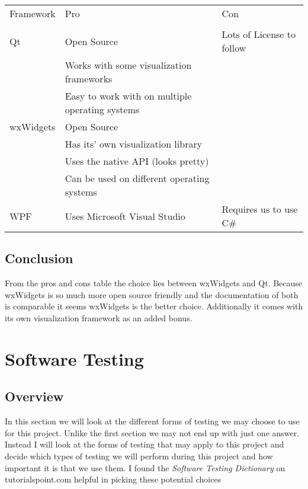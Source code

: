 \documentclass[onecolumn, draftclsnofoot,10pt, compsoc]{IEEEtran}
\begin{document}
\vspace{1cm}
\begin{center}
\begin{tabular}{ | l || l | l | } 
\hline
Framework   & Pro   & Con   \\
            &       &       \\
\hline
\hline
Qt          & Open Source & Lots of License to follow \\
            & Works with some visualization frameworks & \\
            & Easy to work with on multiple operating systems & \\
            
\hline
wxWidgets   & Open Source &  \\ 
            & Has its' own visualization library & \\
            & Uses the native API (looks pretty) & \\
            & Can be used on different operating systems & \\
\hline
WPF         & Uses Microsoft Visual Studio  &  Requires us to use C\# \\ 
\hline
\end{tabular}
\end{center}



\subsection{Conclusion}
From the pros and cons table the choice lies between wxWidgets and Qt. 
Because wxWidgets is so much more open source friendly and the documentation of both is comparable it seems wxWidgets is the better choice. 
Additionally it comes with its own visualization framework as an added bonus. 


\section{Software Testing}

\subsection{Overview}
In this section we will look at the different forms of testing we may choose to use for this project. 
Unlike the first section we may not end up with just one answer. 
Instead I will look at the forms of testing that may apply to this project and decide which types of testing we will perform during this project and how important it is that we use them. 
I found the \textit{Software Testing Dictionary} on tutorialspoint.com helpful in picking these potential choices \cite{tutorials}
\end{document}
